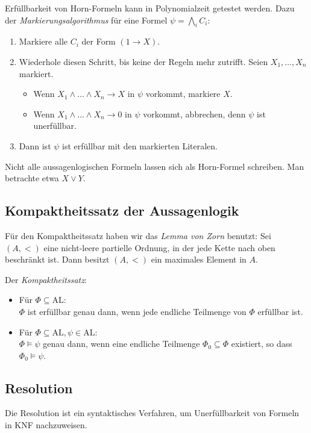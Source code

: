 \documentclass[a4paper,parskip=half*,DIV=15,fontsize=11pt]{scrartcl}
\newcommand{\AL}{\mathrm{AL}}
\begin{document}
Erfüllbarkeit von Horn-Formeln kann in Polynomialzeit getestet werden. Dazu der \emph{Markierungsalgorithmus} für eine Formel $\psi = \bigwedge_i C_i$:
\begin{enumerate}
\item Markiere alle $C_i$ der Form $(1 \to X)$.
\item Wiederhole diesen Schritt, bis keine der Regeln mehr zutrifft. Seien $X_1, \ldots, X_n$ markiert.
    \begin{itemize}
        \item Wenn $X_1 \land \ldots \land X_n \to X$ in $\psi$ vorkommt, markiere $X$.
        \item Wenn $X_1 \land \ldots \land X_n \to 0$ in $\psi$ vorkommt, abbrechen, denn $\psi$ ist unerfüllbar.
    \end{itemize}
\item Dann ist $\psi$ ist erfüllbar mit den markierten Literalen.
\end{enumerate}

Nicht alle aussagenlogischen Formeln lassen sich als Horn-Formel schreiben. Man betrachte etwa $X \lor Y$.

\subsection{Kompaktheitssatz der Aussagenlogik}

Für den Kompaktheitssatz haben wir das \emph{Lemma von Zorn} benutzt: Sei $(A, <)$ eine nicht-leere partielle Ordnung, in der jede Kette nach oben beschränkt ist. Dann besitzt $(A, <)$ ein maximales Element in $A$.

Der \emph{Kompaktheitssatz}:
\begin{itemize}
\item Für $\Phi \subseteq \AL$:\\
$\Phi$ ist erfüllbar genau dann, wenn jede endliche Teilmenge von $\Phi$ erfüllbar ist.
\item
Für $\Phi \subseteq \AL, \psi \in \AL$:\\
$\Phi \models \psi$ genau dann, wenn eine endliche Teilmenge $\Phi_0 \subseteq \Phi$ existiert, so dass $\Phi_0 \models \psi$.
\end{itemize}

\subsection{Resolution}

Die Resolution ist ein syntaktisches Verfahren, um Unerfüllbarkeit von Formeln in KNF nachzuweisen.
\end{document}
